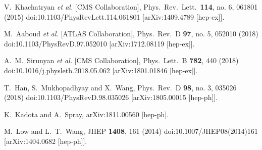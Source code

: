 \documentclass[nofootinbib,prd,aps,superscriptaddress,preprintnumbers]{revtex4}
\begin{document}
\begin{thebibliography}{99}
  V.~Khachatryan {\it et al.} [CMS Collaboration],
  Phys.\ Rev.\ Lett.\  {\bf 114}, no. 6, 061801 (2015)
  doi:10.1103/PhysRevLett.114.061801
  [arXiv:1409.4789 [hep-ex]].

  M.~Aaboud {\it et al.} [ATLAS Collaboration],
  Phys.\ Rev.\ D {\bf 97}, no. 5, 052010 (2018)
  doi:10.1103/PhysRevD.97.052010
  [arXiv:1712.08119 [hep-ex]].

  A.~M.~Sirunyan {\it et al.} [CMS Collaboration],
  Phys.\ Lett.\ B {\bf 782}, 440 (2018)
  doi:10.1016/j.physletb.2018.05.062
  [arXiv:1801.01846 [hep-ex]].

  T.~Han, S.~Mukhopadhyay and X.~Wang,
  Phys.\ Rev.\ D {\bf 98}, no. 3, 035026 (2018)
  doi:10.1103/PhysRevD.98.035026
 [arXiv:1805.00015 [hep-ph]].

  K.~Kadota and A.~Spray,
  arXiv:1811.00560 [hep-ph].

  M.~Low and L.~T.~Wang,
  JHEP {\bf 1408}, 161 (2014)
  doi:10.1007/JHEP08(2014)161
  [arXiv:1404.0682 [hep-ph]].

\end{thebibliography}
\let\addcontentsline\oldaddcontentsline
\end{document}
